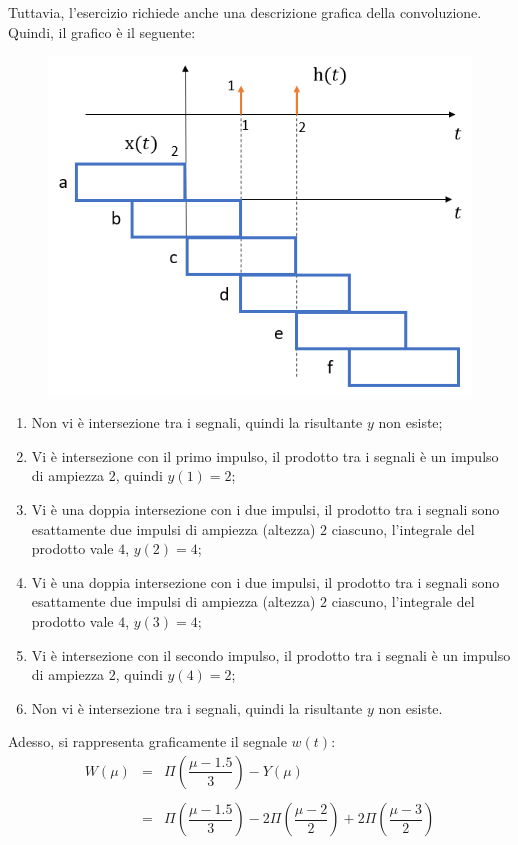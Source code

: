 \documentclass[a4paper]{article}
\begin{document}
	\noindent
	Tuttavia, l'esercizio richiede anche una descrizione grafica della convoluzione. Quindi, il grafico è il seguente:
	\begin{figure}[!htp]
		\centering
		\includegraphics[width=.57\textwidth]{img/fig_11.png}
	\end{figure}
	\begin{enumerate}[label=\alph*)]
		\item Non vi è intersezione tra i segnali, quindi la risultante $y$ non esiste;
		
		\item Vi è intersezione con il primo impulso, il prodotto tra i segnali è un impulso di ampiezza $2$, quindi $y\left(1\right)=2$;
		
		\item Vi è una doppia intersezione con i due impulsi, il prodotto tra i segnali sono esattamente due impulsi di ampiezza (altezza) $2$ ciascuno, l'integrale del prodotto vale $4$, $y\left(2\right) = 4$;
		
		\item Vi è una doppia intersezione con i due impulsi, il prodotto tra i segnali sono esattamente due impulsi di ampiezza (altezza) $2$ ciascuno, l'integrale del prodotto vale $4$, $y\left(3\right) = 4$;
		
		\item Vi è intersezione con il secondo impulso, il prodotto tra i segnali è un impulso di ampiezza $2$, quindi $y\left(4\right)=2$;
		
		\item Non vi è intersezione tra i segnali, quindi la risultante $y$ non esiste.
	\end{enumerate}
	Adesso, si rappresenta graficamente il segnale $w\left(t\right)$:
	\begin{equation*}
		\begin{array}{lll}
			W\left(\mu\right) & = & \Pi\left(\dfrac{\mu - 1.5}{3}\right) - Y\left(\mu\right) \\
			\\
			& = & \Pi\left(\dfrac{\mu - 1.5}{3}\right) - 2\Pi\left(\dfrac{\mu - 2}{2}\right) + 2\Pi\left(\dfrac{\mu - 3}{2}\right)
		\end{array}
	\end{equation*}
\end{document}
